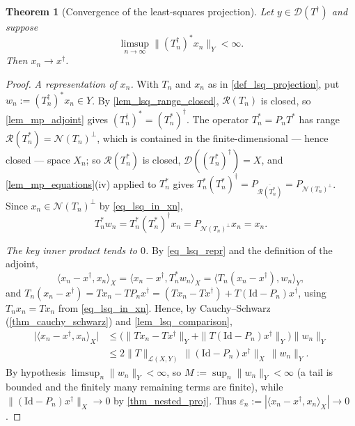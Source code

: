 \documentclass[a4paper]{report}
\theoremstyle{plain}
\newtheorem{theorem}{Theorem}[chapter]
\theoremstyle{definition}
\theoremstyle{remark}
\newcommand{\Ll}{\mathcal{L}}
\newcommand{\Ran}{\mathcal{R}}
\newcommand{\Ker}{\mathcal{N}}
\newcommand{\Dom}{\mathcal{D}}
\newcommand{\Id}{\mathrm{Id}}
\newcommand{\dg}{^{\dagger}}
\begin{document}
\begin{theorem}[Convergence of the least-squares projection]
  \label{thm_lsq_convergence}
  Let $y \in \Dom(T\dg)$ and suppose
  \[
    \limsup_{n \to \infty} \bigl\|(T_n\dg)^{*} x_n\bigr\|_Y < \infty .
  \]
  Then $x_n \to x\dg$.
\end{theorem}

\begin{proof}
  \emph{A representation of $x_n$.}  With $T_n$ and $x_n$ as in
  \cref{def_lsq_projection}, put $w_n := (T_n\dg)^{*}x_n \in Y$.  By
  \cref{lem_lsq_range_closed}, $\Ran(T_n)$ is closed, so \cref{lem_mp_adjoint}
  gives $(T_n\dg)^{*} = (T_n^{*})\dg$.  The operator $T_n^{*} = P_nT^{*}$ has range
  $\Ran(T_n^{*}) = \Ker(T_n)^{\perp}$, which is contained in the finite-dimensional ---
  hence closed --- space $X_n$; so $\Ran(T_n^{*})$ is closed, $\Dom((T_n^{*})\dg) = X$,
  and \cref{lem_mp_equations}(iv) applied to $T_n^{*}$ gives
  $T_n^{*}(T_n^{*})\dg = P_{\overline{\Ran(T_n^{*})}} = P_{\Ker(T_n)^{\perp}}$.  Since
  $x_n \in \Ker(T_n)^{\perp}$ by \eqref{eq_lsq_in_xn},
  \begin{equation}\label{eq_lsq_repr}
    T_n^{*}w_n = T_n^{*}(T_n^{*})\dg x_n = P_{\Ker(T_n)^{\perp}}x_n = x_n .
  \end{equation}

  \emph{The key inner product tends to $0$.}  By \eqref{eq_lsq_repr} and the definition of
  the adjoint,
  \[
    \langle x_n - x\dg, x_n\rangle_X = \langle x_n - x\dg, T_n^{*}w_n\rangle_X
      = \langle T_n(x_n - x\dg), w_n\rangle_Y ,
  \]
  and $T_n(x_n - x\dg) = Tx_n - TP_nx\dg = (Tx_n - Tx\dg) + T(\Id - P_n)x\dg$, using
  $T_nx_n = Tx_n$ from \eqref{eq_lsq_in_xn}.  Hence, by Cauchy--Schwarz
  (\cref{thm_cauchy_schwarz}) and \cref{lem_lsq_comparison},
  \begin{equation}\label{eq_lsq_cross}
    \begin{aligned}
      \bigl|\langle x_n - x\dg, x_n\rangle_X\bigr|
        &\le \bigl(\|Tx_n - Tx\dg\|_Y + \|T(\Id - P_n)x\dg\|_Y\bigr)\|w_n\|_Y \\
        &\le 2\|T\|_{\Ll(X,Y)}\,\|(\Id - P_n)x\dg\|_X\,\|w_n\|_Y .
    \end{aligned}
  \end{equation}
  By hypothesis $\limsup_n\|w_n\|_Y < \infty$, so $M := \sup_n\|w_n\|_Y < \infty$ (a tail
  is bounded and the finitely many remaining terms are finite), while
  $\|(\Id - P_n)x\dg\|_X \to 0$ by \cref{thm_nested_proj}.  Thus
  $\varepsilon_n := |\langle x_n - x\dg, x_n\rangle_X| \to 0$.


\end{proof}
\end{document}
